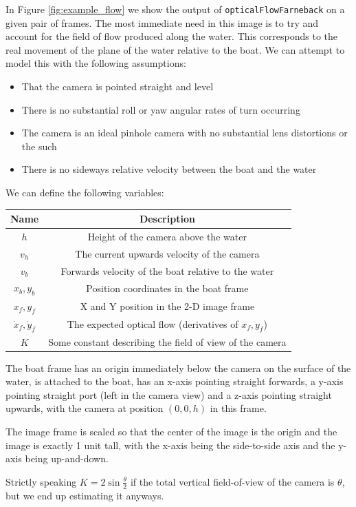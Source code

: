 \documentclass{article}
\begin{document}
In Figure \ref{fig:example_flow} we show the output of
\texttt{opticalFlowFarneback} on a given pair of frames. The most immediate need
in this image is to try and account for the field of flow produced along the
water. This corresponds to the real movement of the plane of the water relative
to the boat. We can attempt to model this with the following assumptions:
\begin{itemize}
\item That the camera is pointed straight and level
\item There is no substantial roll or yaw angular rates of turn occurring
\item The camera is an ideal pinhole camera with no substantial lens distortions
      or the such
\item There is no sideways relative velocity between the boat and the water
\end{itemize}

We can define the following variables:

\begin{tabular}{c|c}
Name & Description \\ \hline
$h$ & Height of the camera above the water \\
$v_h$ & The current upwards velocity of the camera \\
$v_b$ & Forwards velocity of the boat relative to the water \\
$x_b, y_b$ & Position coordinates in the boat frame \\
$x_f, y_f$ & X and Y position in the 2-D image frame \\
$\dot{x}_f, \dot{y}_f$ & The expected optical flow (derivatives of $x_f, y_f$)
\\
$K$ & Some constant describing the field of view of the camera \\
\end{tabular}

The boat frame has an origin immediately below the camera on the surface of
the water, is attached to the boat, has an x-axis pointing straight forwards,
a y-axis pointing straight port (left in the camera view) and a z-axis pointing
straight upwards, with the camera at position $(0, 0, h)$ in this frame.

The image frame is scaled so that the center of the image is the origin and
the image is exactly 1 unit tall, with the x-axis being the side-to-side axis
and the y-axis being up-and-down.

Strictly speaking $K = 2\sin\frac\theta2$ if the total vertical field-of-view
of the camera is $\theta$, but we end up estimating it anyways.
\end{document}
